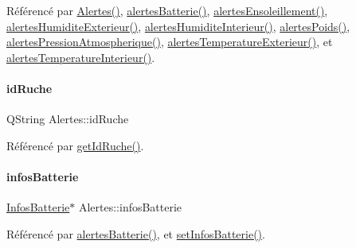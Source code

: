 Référencé par \hyperlink{class_alertes_ad2e4e3907f97bdd06840dfeee0a87ddb}{Alertes()}, \hyperlink{class_alertes_ad708a4b800d56c1439b65d12a3c6b027}{alertes\+Batterie()}, \hyperlink{class_alertes_ae7ad960c530a6a7e82df3ed55d159a68}{alertes\+Ensoleillement()}, \hyperlink{class_alertes_a8606946eaa04dfd29bb7951b2b850a04}{alertes\+Humidite\+Exterieur()}, \hyperlink{class_alertes_a7558cb097dc392547ceb12ab4d6cbd4c}{alertes\+Humidite\+Interieur()}, \hyperlink{class_alertes_ac4b8925cc6c262cf7254b1576ba07d33}{alertes\+Poids()}, \hyperlink{class_alertes_ab8a33e82cdd4d4e0560c9ba6e10ca8d5}{alertes\+Pression\+Atmospherique()}, \hyperlink{class_alertes_a91fb2665fa8b6c32c74bfe4d1b89a2d8}{alertes\+Temperature\+Exterieur()}, et \hyperlink{class_alertes_a8bc56cf9eb525624b2c1f5b20f86724b}{alertes\+Temperature\+Interieur()}.

\mbox{\label{class_alertes_ae3f9d7aa34ab3c83a66c8484e2b89925}} 
\paragraph{\texorpdfstring{id\+Ruche}{idRuche}}
{\footnotesize\ttfamily Q\+String Alertes\+::id\+Ruche\hspace{0.3cm}{\ttfamily [private]}}



Référencé par \hyperlink{class_alertes_a2374f9e3e5dc95eacaa4eaa5d98540a7}{get\+Id\+Ruche()}.

\mbox{\label{class_alertes_ad5c756a52ff4d6ae85cc0f03bd80582b}} 
\paragraph{\texorpdfstring{infos\+Batterie}{infosBatterie}}
{\footnotesize\ttfamily \hyperlink{class_infos_batterie}{Infos\+Batterie}$\ast$ Alertes\+::infos\+Batterie\hspace{0.3cm}{\ttfamily [private]}}



Référencé par \hyperlink{class_alertes_ad708a4b800d56c1439b65d12a3c6b027}{alertes\+Batterie()}, et \hyperlink{class_alertes_a8bbe30ddc4893f943781749917b23463}{set\+Infos\+Batterie()}.

\mbox{\label{class_alertes_abd9b6ff4e9f1df3c360374cceb8d0601}} 
